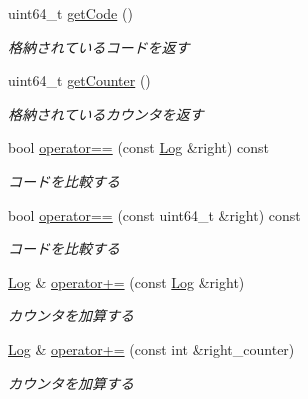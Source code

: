\begin{DoxyCompactItemize}
uint64\+\_\+t \mbox{\hyperlink{class_log_afb03ed79ec74b835e56c102b43283dcc}{get\+Code}} ()
\begin{DoxyCompactList}\small\item\em 格納されているコードを返す \end{DoxyCompactList}\item 
\mbox{\label{class_log_ad409f86ca89bf9ab8385f8de93cd6b0e}} 
uint64\+\_\+t \mbox{\hyperlink{class_log_ad409f86ca89bf9ab8385f8de93cd6b0e}{get\+Counter}} ()
\begin{DoxyCompactList}\small\item\em 格納されているカウンタを返す \end{DoxyCompactList}\item 
\mbox{\label{class_log_ad750abb453bacd37311714fcde38d328}} 
bool \mbox{\hyperlink{class_log_ad750abb453bacd37311714fcde38d328}{operator==}} (const \mbox{\hyperlink{class_log}{Log}} \&right) const
\begin{DoxyCompactList}\small\item\em コードを比較する \end{DoxyCompactList}\item 
\mbox{\label{class_log_a730e547db227f0528f70cc3dfe4f63b6}} 
bool \mbox{\hyperlink{class_log_a730e547db227f0528f70cc3dfe4f63b6}{operator==}} (const uint64\+\_\+t \&right) const
\begin{DoxyCompactList}\small\item\em コードを比較する \end{DoxyCompactList}\item 
\mbox{\label{class_log_a9651f728aa85d574682ded0d532f9e1c}} 
\mbox{\hyperlink{class_log}{Log}} \& \mbox{\hyperlink{class_log_a9651f728aa85d574682ded0d532f9e1c}{operator+=}} (const \mbox{\hyperlink{class_log}{Log}} \&right)
\begin{DoxyCompactList}\small\item\em カウンタを加算する \end{DoxyCompactList}\item 
\mbox{\label{class_log_a6d3abe05a14362598216be751c141341}} 
\mbox{\hyperlink{class_log}{Log}} \& \mbox{\hyperlink{class_log_a6d3abe05a14362598216be751c141341}{operator+=}} (const int \&right\+\_\+counter)
\begin{DoxyCompactList}\small\item\em カウンタを加算する \end{DoxyCompactList}\end{DoxyCompactItemize}

